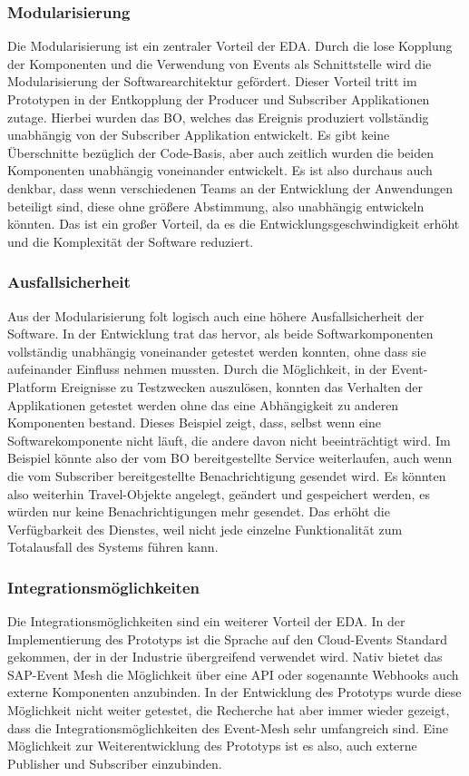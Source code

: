 \subsubsection*{Modularisierung}
Die Modularisierung ist ein zentraler Vorteil der \ac{EDA}. Durch die lose Kopplung der Komponenten und die Verwendung von Events als Schnittstelle wird die Modularisierung der Softwarearchitektur gefördert. Dieser Vorteil tritt im Prototypen in der Entkopplung der Producer und Subscriber Applikationen zutage. Hierbei wurden das \ac{BO}, welches das Ereignis produziert vollständig unabhängig von der Subscriber Applikation entwickelt. Es gibt keine Überschnitte bezüglich der Code-Basis, aber auch zeitlich wurden die beiden Komponenten unabhängig voneinander entwickelt. Es ist also durchaus auch denkbar, dass wenn verschiedenen Teams an der Entwicklung der Anwendungen beteiligt sind, diese ohne größere Abstimmung, also unabhängig entwickeln könnten. Das ist ein großer Vorteil, da es die Entwicklungsgeschwindigkeit erhöht und die Komplexität der Software reduziert.
\subsubsection*{Ausfallsicherheit}
Aus der Modularisierung folt logisch auch eine höhere Ausfallsicherheit der Software. In der Entwicklung trat das hervor, als beide Softwarkomponenten vollständig unabhängig voneinander getestet werden konnten, ohne dass sie aufeinander Einfluss nehmen mussten. Durch die Möglichkeit, in der Event-Platform Ereignisse zu Testzwecken auszulösen, konnten das Verhalten der Applikationen getestet werden ohne das eine Abhängigkeit zu anderen Komponenten bestand. Dieses Beispiel zeigt, dass, selbst wenn eine Softwarekomponente nicht läuft, die andere davon nicht beeinträchtigt wird. Im Beispiel könnte also der vom \ac{BO} bereitgestellte Service weiterlaufen, auch wenn die vom Subscriber bereitgestellte Benachrichtigung gesendet wird. Es könnten also weiterhin Travel-Objekte angelegt, geändert und gespeichert werden, es würden nur keine Benachrichtigungen mehr gesendet. Das erhöht die Verfügbarkeit des Dienstes, weil nicht jede einzelne Funktionalität zum Totalausfall des Systems führen kann.
\subsubsection*{Integrationsmöglichkeiten}
Die Integrationsmöglichkeiten sind ein weiterer Vorteil der \ac{EDA}. In der Implementierung des Prototyps ist die Sprache auf den Cloud-Events Standard gekommen, der in der Industrie übergreifend verwendet wird. Nativ bietet das SAP-Event Mesh die Möglichkeit über eine API oder sogenannte Webhooks auch externe Komponenten anzubinden. In der Entwicklung des Prototyps wurde diese Möglichkeit nicht weiter getestet, die Recherche hat aber immer wieder gezeigt, dass die Integrationsmöglichkeiten des Event-Mesh sehr umfangreich sind. Eine Möglichkeit zur Weiterentwicklung des Prototyps ist es also, auch externe Publisher und Subscriber einzubinden.

